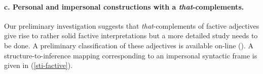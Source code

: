 \documentclass[10pt]{article}
\begin{document}

\vspace{-.2in}
\paragraph{c. Personal and impersonal constructions with a \textit{that}-complements.} 
Our preliminary investigation suggests that \textit{that}-complements of factive adjectives give rise to rather solid factive interpretations but a more detailed study needs to be done.  A preliminary classification of these adjectives is available on-line (\cite{faust-adj-pol-lex}). A structure-to-inference mapping corresponding to an impersonal syntactic frame is given in (\ref{sti-factive}).
\vspace{-0.5em}
\vspace{-0.5em}



\end{document}
